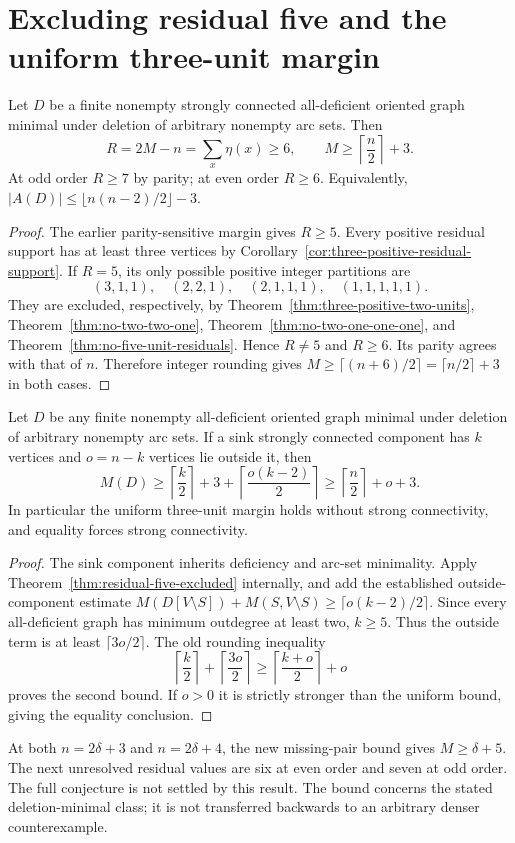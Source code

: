 \section{Excluding residual five and the uniform three-unit margin}
\label{sec:residual-six-margin}

\begin{theorem}\label{thm:residual-five-excluded}
Let $D$ be a finite nonempty strongly connected all-deficient oriented
graph minimal under deletion of arbitrary nonempty arc sets. Then
\[
 R=2M-n=\sum_x\eta(x)\ge6,
 \qquad
 {M\ge\left\lceil\frac n2\right\rceil+3.}
\]
At odd order $R\ge7$ by parity; at even order $R\ge6$.
Equivalently,
$|A(D)|\le\lfloor n(n-2)/2\rfloor-3$.
\end{theorem}
\begin{proof}
The earlier parity-sensitive margin gives $R\ge5$.
Every positive residual support has at least three vertices by
Corollary~\ref{cor:three-positive-residual-support}.
If $R=5$, its only possible positive integer partitions are
\[
 (3,1,1),\quad(2,2,1),\quad(2,1,1,1),\quad(1,1,1,1,1).
\]
They are excluded, respectively, by
Theorem~\ref{thm:three-positive-two-units},
Theorem~\ref{thm:no-two-two-one},
Theorem~\ref{thm:no-two-one-one-one}, and
Theorem~\ref{thm:no-five-unit-residuals}.
Hence $R\ne5$ and $R\ge6$.
Its parity agrees with that of $n$. Therefore integer rounding gives
$M\ge\lceil(n+6)/2\rceil=\lceil n/2\rceil+3$ in both cases.
\end{proof}

\begin{corollary}
\label{cor:residual-six-sink}
Let $D$ be any finite nonempty all-deficient oriented graph minimal
under deletion of arbitrary nonempty arc sets. If a sink strongly
connected component has $k$ vertices and $o=n-k$ vertices lie outside
it, then
\[
 M(D)\ge\left\lceil\frac{k}{2}\right\rceil+3
       +\left\lceil\frac{o(k-2)}2\right\rceil
 \ge\left\lceil\frac n2\right\rceil+o+3.
\]
In particular the uniform three-unit margin holds without strong
connectivity, and equality forces strong connectivity.
\end{corollary}
\begin{proof}
The sink component inherits deficiency and arc-set minimality.
Apply Theorem~\ref{thm:residual-five-excluded} internally, and add the
established outside-component estimate
$M(D[V\setminus S])+M(S,V\setminus S)\ge\lceil o(k-2)/2\rceil$.
Since every all-deficient graph has minimum outdegree at least two,
$k\ge5$. Thus the outside term is at least $\lceil3o/2\rceil$.
The old rounding inequality
\[
 \left\lceil\frac{k}{2}\right\rceil
 +\left\lceil\frac{3o}{2}\right\rceil
 \ge\left\lceil\frac{k+o}{2}\right\rceil+o
\]
proves the second bound. If $o>0$ it is strictly stronger than the
uniform bound, giving the equality conclusion.
\end{proof}

At both $n=2\delta+3$ and $n=2\delta+4$, the new missing-pair bound
gives $M\ge\delta+5$.
The next unresolved residual values are six at even order and seven
at odd order. The full conjecture is not settled by this result.
The bound concerns the stated deletion-minimal class; it is not
transferred backwards to an arbitrary denser counterexample.
